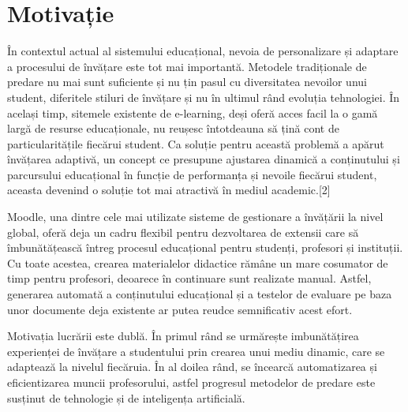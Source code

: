 \chapter*{Motivație} 

În contextul actual al sistemului educațional, nevoia de personalizare și adaptare a procesului de învățare este tot mai importantă. Metodele tradiționale de predare nu mai sunt suficiente 
și nu țin pasul cu diversitatea nevoilor unui student, diferitele stiluri de învățare și nu în ultimul rând evoluția tehnologiei. În același timp, sitemele existente de e-learning, deși oferă
acces facil la o gamă largă de resurse educaționale, nu reușesc întotdeauna să țină cont de particularitățile fiecărui student. Ca soluție pentru această problemă a apărut învățarea adaptivă,
un concept ce presupune ajustarea dinamică a conținutului și parcursului educațional în funcție de performanța și nevoile fiecărui student, aceasta devenind o soluție tot mai atractivă în 
mediul academic.[2]

Moodle, una dintre cele mai utilizate sisteme de gestionare a învățării la nivel global, oferă deja un cadru flexibil pentru dezvoltarea de extensii care să îmbunătățească întreg procesul educațional
pentru studenți, profesori și instituții. Cu toate acestea, crearea materialelor didactice rămâne un mare cosumator de timp pentru profesori, deoarece în continuare sunt realizate manual.
Astfel, generarea automată a conținutului educațional și a testelor de evaluare pe baza unor documente deja existente ar putea reudce semnificativ acest efort.

Motivația lucrării este dublă. În primul rând se urmărește imbunătățirea expe\-rien\-ței de învățare a studentului prin crearea unui mediu dinamic, care se adaptează la nivelul fiecăruia. În 
al doilea rând, se încearcă automatizarea și eficientizarea muncii profesorului, astfel progresul metodelor de predare este susținut de tehnologie și de inteligența artificială.

